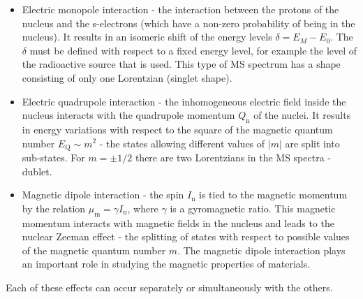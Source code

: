 \begin{itemize}
\item Electric monopole interaction - the interaction between the protons of the nucleus and the s-electrons (which have a non-zero probability of being in the nucleus). It results in an isomeric shift of the energy levels $\delta = E_M - E_0$. The $\delta$ must be defined with respect to a fixed energy level, for example the level of the radioactive source that is used. This type of MS spectrum has a shape consisting of only one Lorentzian (singlet shape).
\item Electric quadrupole interaction - the inhomogeneous electric field inside the nucleus interacts with the quadrupole momentum $Q_{\textrm{n}}$ of the nuclei. It results in energy variations with respect to the square of the magnetic quantum number $E_{\textrm{Q}} \sim m^{2}$ - the states allowing different values of $|m|$ are split into sub-states. For $m = \pm 1/2$ there are two Lorentzians in the MS spectra - dublet.
\item Magnetic dipole interaction - the spin $I_{\textrm{n}}$ is tied to the magnetic momentum by the relation $\mu_{\textrm{m}} = \gamma I_{\textrm{n}}$, where $\gamma$ is a gyromagnetic ratio. This magnetic momentum interacts with magnetic fields in the nucleus and leads to the nuclear Zeeman effect - the splitting of states with respect to possible values of the magnetic quantum number $m$. The magnetic dipole interaction plays an important role in studying the magnetic properties of materials.
\end{itemize}
Each of these effects can occur separately or simultaneously with the others.
%
%
